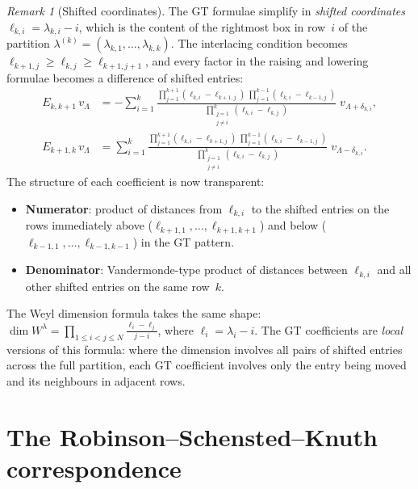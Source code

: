 \documentclass[12pt,a4paper]{article}
\theoremstyle{definition}
\theoremstyle{remark}
\newtheorem{remark}[theorem]{Remark}
\begin{document}
\begin{remark}[Shifted coordinates]\label{rem:shifted}
The GT formulae simplify in \emph{shifted coordinates}
$\ell_{k,i} = \lambda_{k,i} - i$, which is the content of the
rightmost box in row~$i$ of the partition
$\lambda^{(k)} = (\lambda_{k,1}, \ldots, \lambda_{k,k})$.
The interlacing condition becomes
$\ell_{k+1,j} \geqslant \ell_{k,j} \geqslant \ell_{k+1,j+1}$,
and every factor in the raising and lowering formulae becomes a
difference of shifted entries:
\begin{align}
  E_{k,k+1}\, v_\Lambda
  &= -\sum_{i=1}^k
    \frac{\displaystyle\prod_{j=1}^{k+1}(\ell_{k,i} - \ell_{k+1,j})
    \;\prod_{j=1}^{k-1}(\ell_{k,i} - \ell_{k-1,j})}
    {\displaystyle\prod_{\substack{j=1 \\ j \neq i}}^{k}
    (\ell_{k,i} - \ell_{k,j})}
    \; v_{\Lambda + \delta_{k,i}},
  \label{eq:GT-raise-shifted} \\[6pt]
  E_{k+1,k}\, v_\Lambda
  &= \sum_{i=1}^k
    \frac{\displaystyle\prod_{j=1}^{k+1}(\ell_{k,i} - \ell_{k+1,j})
    \;\prod_{j=1}^{k-1}(\ell_{k,i} - \ell_{k-1,j})}
    {\displaystyle\prod_{\substack{j=1 \\ j \neq i}}^{k}
    (\ell_{k,i} - \ell_{k,j})}
    \; v_{\Lambda - \delta_{k,i}}.
  \label{eq:GT-lower-shifted}
\end{align}
The structure of each coefficient is now transparent:
\begin{itemize}
\item \textbf{Numerator}: product of distances from $\ell_{k,i}$ to
  the shifted entries on the rows immediately above
  ($\ell_{k+1,1}, \ldots, \ell_{k+1,k+1}$) and below
  ($\ell_{k-1,1}, \ldots, \ell_{k-1,k-1}$) in the GT pattern.
\item \textbf{Denominator}: Vandermonde-type product of distances
  between $\ell_{k,i}$ and all other shifted entries on the same
  row~$k$.
\end{itemize}
The Weyl dimension formula takes the same shape:
$\dim W^\lambda = \prod_{1 \leqslant i < j \leqslant N}
\frac{\ell_i - \ell_j}{j - i}$, where $\ell_i = \lambda_i - i$.
The GT coefficients are \emph{local} versions of this formula:
where the dimension involves all pairs of shifted entries across
the full partition, each GT coefficient involves only the entry
being moved and its neighbours in adjacent rows.
\end{remark}

\section{The Robinson--Schensted--Knuth correspondence}
\label{sec:RSK}
\end{document}
